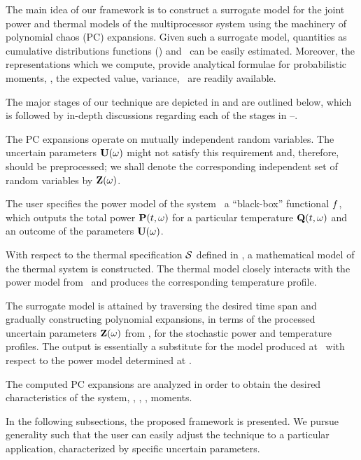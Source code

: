 
The main idea of our framework is to construct a surrogate model for the joint power and thermal models of the multiprocessor system using the machinery of polynomial chaos (PC) expansions.
Given such a surrogate model, quantities as cumulative distributions functions (\cdfs) and \pdfs\ can be easily estimated. Moreover, the representations which we compute, provide analytical formulae for probabilistic moments, \ie, the expected value, variance, \etc\ are readily available.

The major stages of our technique are depicted in  and are outlined below, which is followed by in-depth discussions regarding each of the stages in --.

 The PC expansions operate on mutually independent random variables. The uncertain parameters $\mathbf{U}(\omega)$ might not satisfy this requirement and, therefore, should be preprocessed; we shall denote the corresponding independent set of random variables by $\mathbf{Z}(\omega)$.

 The user specifies the power model of the system \via\ a ``black-box'' functional $f$, which outputs the total power $\mathbf{P}(t, \omega)$ for a particular temperature $\mathbf{Q}(t, \omega)$ and an outcome of the parameters $\mathbf{U}(\omega)$.

 With respect to the thermal specification $\mathcal{S}$ defined in , a mathematical model of the thermal system is constructed. The thermal model closely interacts with the power model from \ and produces the corresponding temperature profile.

 The surrogate model is attained by traversing the desired time span and gradually constructing polynomial expansions, in terms of the processed uncertain parameters $\mathbf{Z}(\omega)$ from , for the stochastic power and temperature profiles. The output is essentially a substitute for the model produced at \ with respect to the power model determined at .

 The computed PC expansions are analyzed in order to obtain the desired characteristics of the system, \eg, \cdfs, \pdfs, moments.

In the following subsections, the proposed framework is presented. We pursue generality such that the user can easily adjust the technique to a particular application, characterized by specific uncertain parameters.

